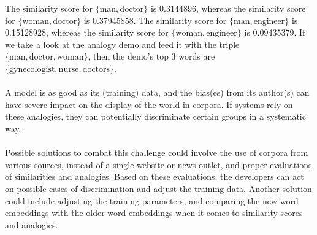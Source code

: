 \documentclass[a4paper, 11pt]{article}
\begin{document}
The similarity score for $\{\text{man}, \text{doctor}\}$ is 0.3144896, whereas the similarity score for $\{\text{woman}, \text{doctor}\}$ is 0.37945858. The similarity score for $\{\text{man}, \text{engineer}\}$ is 0.15128928, whereas the similarity score for $\{\text{woman}, \text{engineer}\}$ is 0.09435379. If we take a look at the analogy demo and feed it with the triple $\{\text{man}, \text{doctor}, \text{woman}\}$, then the demo's top 3 words are $\{\text{gynecologist}, \text{nurse}, \text{doctors}\}$. \\

\noindent{}\\	

A model is as good as its (training) data, and the bias(es) from its author(s) can have severe impact on the display of the world in corpora. If systems rely on these analogies, they can potentially discriminate certain groups in a systematic way. \\

\noindent{}\\	

Possible solutions to combat this challenge could involve the use of corpora from various sources, instead of a single website or news outlet, and proper evaluations of similarities and analogies. Based on these evaluations, the developers can act on possible cases of discrimination and adjust the training data. Another solution could include adjusting the training parameters, and comparing the new word embeddings with the older word embeddings when it comes to similarity scores and analogies.



\end{document}
